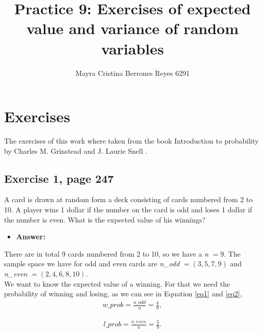 \documentclass{article}
\begin{document}
\title{%
  Practice 9: Exercises of expected value and variance of random variables} %
\author{Mayra Cristina Berrones Reyes 6291}

\maketitle

\section{Exercises}

The exercises of this work where taken from the book Introduction to probability by Charles M. Grinstead and J. Laurie Snell \cite{grin}.

\subsection{Exercise 1, page 247}

A card is drawn at random form a deck consisting of cards numbered from 2 to 10. A player wins 1 dollar if the number on the card is odd and loses 1 dollar if the number is even. What is the expected value of his winnings?\\


\begin{itemize}
\item \textbf{Answer:}
\end{itemize}

There are in total 9 cards numbered from 2 to 10, so we have a \textit{n} $= 9$. The sample space we have for odd and even cards are \textit{n\_odd} $= (3, 5, 7, 9)$ and \textit{n\_even} $= (2, 4, 6, 8, 10)$.\\

We want to know the expected value of a winning. For that we need the probability of winning and losing, as we can see in Equation \ref{eq1} and \ref{eq2},\\

\begin{eqnarray}
\label{eq1}
\textit{w\_prob} = \frac{n\_odd}{n} = \frac{4}{9},	
\end{eqnarray}

 \begin{eqnarray}
\label{eq2}
\textit{l\_prob} = \frac{n\_even}{n} = \frac{5}{9}.	
\end{eqnarray}
\end{document}
